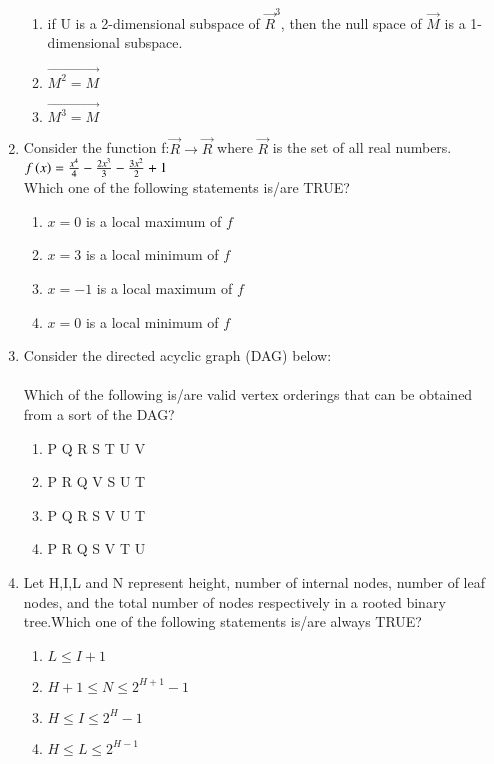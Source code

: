 \documentclass[journal,12pt,onecolumn]{IEEEtran}
\theoremstyle{remark}
\begin{document}
\begin{enumerate}
\begin{enumerate}
      \item if U is a 2-dimensional subspace of $\vec{R}^3$, then the null space of $\vec{M}$ is a 1-dimensional subspace.
      \item $\vec{M^2=M}$
      \item $\vec{M^3=M}$
  \end{enumerate}
  \item Consider the function f:$\vec{R} \to \vec{R}$ where $\vec{R}$ is the set of all real numbers.\\
  $f\left(x\right)=\frac{x^4}{4}-\frac{2x^3}{3}-\frac{3x^2}{2}+1$\\
  Which one of the following statements is/are TRUE?
  \begin{enumerate}
      \item $x=0$ is a local maximum of $f$
      \item $x=3$ is a local minimum of $f$
      \item $x=-1$ is a local maximum of $f$
      \item $x=0$ is a local minimum of $f$
  \end{enumerate}
  \item Consider the directed acyclic graph (DAG) below:\\
  \\
  Which of the following is/are valid vertex orderings that can be obtained from a sort of the DAG?
  \begin{enumerate}
      \item P Q R S T U V
      \item P R Q V S U T
      \item P Q R S V U T
      \item P R Q S V T U
  \end{enumerate}
  \item Let H,I,L and N represent height, number of internal nodes, number of leaf nodes, and the total number of nodes respectively in a rooted binary tree.Which one of the following statements is/are always TRUE?
  \begin{enumerate}
      \item $L\leq I+1$
      \item $H+1 \leq N \leq 2^{H+1}-1$
      \item $H \leq I \leq 2^H-1$
      \item $H \leq L \leq 2^{H-1}$
  \end{enumerate}
  

\end{enumerate}
\end{document}
